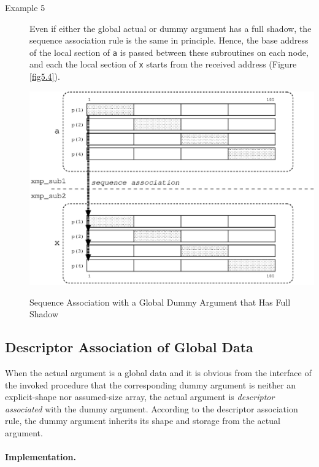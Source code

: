 \begin{description}
\item[Example 5]

	   Even if either the global actual or dummy argument has a full
	   shadow, the sequence association rule is the same in
	   principle. Hence, the base address of the local section of
	   {\tt a} is passed between these subroutines on each node, and
	   each the local section of {\tt x} starts from the received
	   address (Figure \ref{fig5.4}).

\begin{myfigure}
 \includegraphics[scale=0.7]{figs/fig5.4.eps}
 \caption{Sequence Association with a Global Dummy Argument that Has
 Full Shadow}
 \label{fig5.4}
\end{myfigure}

\end{description}


\subsection{Descriptor Association of Global Data}

When the actual argument is a global data and it is obvious from the
interface of the invoked procedure that the corresponding dummy argument
is neither an explicit-shape nor assumed-size array, the actual
argument is {\it descriptor associated} with the dummy
argument. According to the descriptor association rule, the dummy
argument inherits its shape and storage from the actual argument.

\paragraph*{Implementation.}

